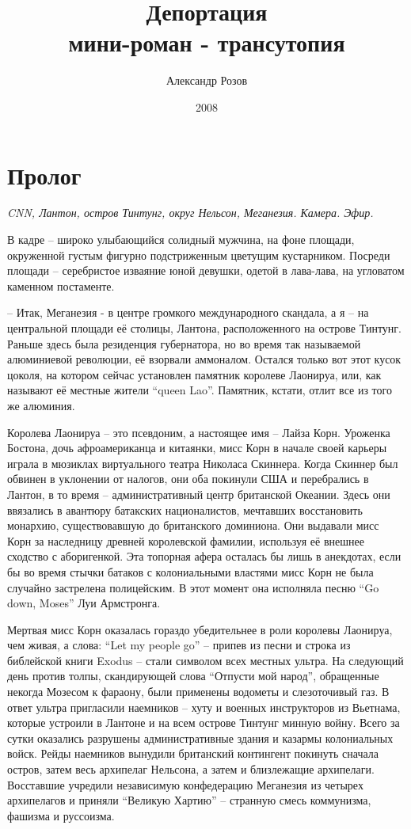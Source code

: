 \documentclass[10pt,final]{book}
\title{Депортация\\мини-роман - трансутопия}
\author{Александр Розов}
\date{2008}
\newcommand{\myblock}[1] {
 {
   \begin{flushright}
    \parbox{2in}{{\small \textit{#1}}}
   \end{flushright}
 }
}
\begin{document}
\pagestyle{empty}

\maketitle


\chapter*{Пролог}
\myblock{CNN, Лантон, остров Тинтунг, округ Нельсон, Меганезия. Камера. Эфир.}

В кадре -- широко улыбающийся солидный мужчина, на фоне площади, окруженной густым фигурно подстриженным цветущим кустарником. Посреди площади -- серебристое изваяние юной девушки, одетой в лава-лава, на угловатом каменном постаменте.

-- Итак, Меганезия - в центре громкого международного скандала, а я -- на центральной площади её столицы, Лантона, расположенного на острове Тинтунг. Раньше здесь была резиденция губернатора, но во время так называемой алюминиевой революции, её взорвали аммоналом. Остался только вот этот кусок цоколя, на котором сейчас установлен памятник королеве Лаонируа, или, как называют её местные жители ``queen Lao''. Памятник, кстати, отлит все из того же алюминия.

Королева Лаонируа -- это псевдоним, а настоящее имя -- Лайза Корн. Уроженка Бостона, дочь афроамериканца и китаянки, мисс Корн в начале своей карьеры играла в мюзиклах виртуального театра Николаса Скиннера. Когда Скиннер был обвинен в уклонении от налогов, они оба покинули США и перебрались в Лантон, в то время -- административный центр британской Океании. Здесь они ввязались в авантюру батакских националистов, мечтавших восстановить монархию, существовавшую до британского доминиона. Они выдавали мисс Корн за наследницу древней королевской фамилии, используя её внешнее сходство с аборигенкой. Эта топорная афера осталась бы лишь в анекдотах, если бы во время стычки батаков с колониальными властями мисс Корн не была случайно застрелена полицейским. В этот момент она исполняла песню ``Go down, Moses'' Луи Армстронга.

Мертвая мисс Корн оказалась гораздо убедительнее в роли королевы Лаонируа, чем живая, а слова: ``Let my people go'' -- припев из песни и строка из библейской книги Exodus -- стали символом всех местных ультра. На следующий день против толпы, скандирующей слова ``Отпусти мой народ'', обращенные некогда Мозесом к фараону, были применены водометы и слезоточивый газ. В ответ ультра пригласили наемников -- хуту и военных инструкторов из Вьетнама, которые устроили в Лантоне и на всем острове Тинтунг минную войну. Всего за сутки оказались разрушены административные здания и казармы колониальных войск. Рейды наемников вынудили британский контингент покинуть сначала остров, затем весь архипелаг Нельсона, а затем и близлежащие архипелаги. Восставшие учредили независимую конфедерацию Меганезия из четырех архипелагов и приняли ``Великую Хартию'' -- странную смесь коммунизма, фашизма и руссоизма.
\end{document}
